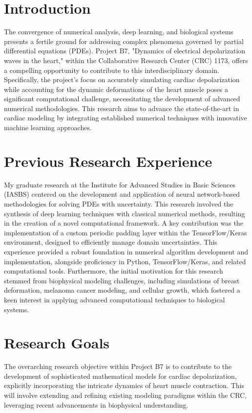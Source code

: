 	
	\section*{Introduction}
	The convergence of numerical analysis, deep learning, and biological systems presents a fertile ground for addressing complex phenomena governed by partial differential equations (PDEs). Project B7, "Dynamics of electrical depolarization waves in the heart," within the Collaborative Research Center (CRC) 1173, offers a compelling opportunity to contribute to this interdisciplinary domain. Specifically, the project's focus on accurately simulating cardiac depolarization while accounting for the dynamic deformations of the heart muscle poses a significant computational challenge, necessitating the development of advanced numerical methodologies. This research aims to advance the state-of-the-art in cardiac modeling by integrating established numerical techniques with innovative machine learning approaches.
	\section*{Previous Research Experience}
	My graduate research at the Institute for Advanced Studies in Basic Sciences (IASBS) centered on the development and application of neural network-based methodologies for solving PDEs with uncertainty. This research involved the synthesis of deep learning techniques with classical numerical methods, resulting in the creation of a novel computational framework. A key contribution was the implementation of a custom periodic padding layer within the TensorFlow/Keras environment, designed to efficiently manage domain uncertainties. This experience provided a robust foundation in numerical algorithm development and implementation, alongside proficiency in Python, TensorFlow/Keras, and related computational tools. Furthermore, the initial motivation for this research stemmed from biophysical modeling challenges, including simulations of breast deformation, melanoma cancer modeling, and cellular growth, which fostered a keen interest in applying advanced computational techniques to biological systems.
	\section*{Research Goals}
	The overarching research objective within Project B7 is to contribute to the development of sophisticated mathematical models for cardiac depolarization, explicitly incorporating the intricate dynamics of heart muscle contraction. This will involve extending and refining existing modeling paradigms within the CRC, leveraging recent advancements in biophysical understanding.
	
